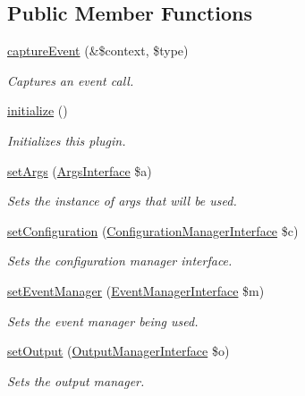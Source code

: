 \subsection*{Public Member Functions}
\begin{DoxyCompactItemize}
\item 
\hyperlink{classTerminalPlugin_a2d3a644ce02ccd384503321aecd590ed}{capture\-Event} (\&\$context, \$type)
\begin{DoxyCompactList}\small\item\em Captures an event call. \end{DoxyCompactList}\item 
\hyperlink{classTerminalPlugin_a45b26f7cbcfa2a7667ca335aa8ee52d1}{initialize} ()
\begin{DoxyCompactList}\small\item\em Initializes this plugin. \end{DoxyCompactList}\item 
\hyperlink{classGenericPlugin_abf0b12b47909ef3c4dada146ea775526}{set\-Args} (\hyperlink{interfaceArgsInterface}{Args\-Interface} \$a)
\begin{DoxyCompactList}\small\item\em Sets the instance of args that will be used. \end{DoxyCompactList}\item 
\hyperlink{classGenericPlugin_a009c5398920a9672a2f13af38756fd5f}{set\-Configuration} (\hyperlink{interfaceConfigurationManagerInterface}{Configuration\-Manager\-Interface} \$c)
\begin{DoxyCompactList}\small\item\em Sets the configuration manager interface. \end{DoxyCompactList}\item 
\hyperlink{classGenericPlugin_afc683b68f471d89aa6a95daebcbfe28a}{set\-Event\-Manager} (\hyperlink{interfaceEventManagerInterface}{Event\-Manager\-Interface} \$m)
\begin{DoxyCompactList}\small\item\em Sets the event manager being used. \end{DoxyCompactList}\item 
\hyperlink{classGenericPlugin_a00fb20d417f3ad2f9839591a84348218}{set\-Output} (\hyperlink{interfaceOutputManagerInterface}{Output\-Manager\-Interface} \$o)
\begin{DoxyCompactList}\small\item\em Sets the output manager. \end{DoxyCompactList}\item 

\end{DoxyCompactItemize}
